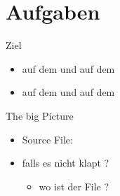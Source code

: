 \section{Aufgaben}

\begin{frame}{Ziel}
 \begin{itemize}
  \item {} auf dem \host und auf dem \targetS
  \item {} auf dem \host und auf dem \targetS
 \end{itemize}
\end{frame}


\begin{frame}{The big Picture}
 \begin{itemize}
  \item Source File: 
  \item falls es nicht klapt ?
  \begin{itemize}
   \item wo ist der File ?
  \end{itemize}
 \end{itemize}
\end{frame}


